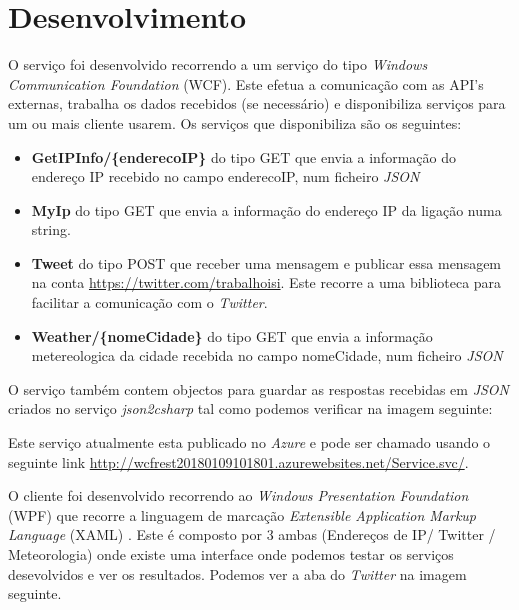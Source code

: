\documentclass[11pt]{report}
\begin{document}
\chapter*{Desenvolvimento}

O serviço foi desenvolvido recorrendo a um serviço do tipo \textit{Windows Communication Foundation} (WCF). Este efetua a comunicação com as API's externas, trabalha os dados recebidos (se necessário) e disponibiliza serviços para um ou mais cliente usarem. Os serviços que disponibiliza são os seguintes:
\begin{itemize}
\item \textbf{GetIPInfo/\{enderecoIP\}} do tipo GET que envia a informação do endereço IP recebido no campo enderecoIP, num ficheiro \textit{JSON}
\item \textbf{MyIp} do tipo GET que envia a informação do endereço IP da ligação numa string.
\item \textbf{Tweet} do tipo POST que receber uma mensagem e publicar essa mensagem na conta \url{https://twitter.com/trabalhoisi}. Este recorre a uma biblioteca\cite{TinyTwitter} para facilitar a comunicação com o \textit{Twitter}.
\item \textbf{Weather/\{nomeCidade\}} do tipo GET que envia a informação metereologica da cidade recebida  no campo nomeCidade, num ficheiro \textit{JSON}
\end{itemize}

\clearpage

O serviço também contem objectos para guardar as respostas recebidas em \textit{JSON} criados no serviço \textit{json2csharp} tal como podemos verificar na imagem seguinte:



Este serviço atualmente esta publicado no \textit{Azure} e pode ser chamado usando o seguinte link \url{http://wcfrest20180109101801.azurewebsites.net/Service.svc/}.

\clearpage

O cliente foi  desenvolvido recorrendo ao \textit{Windows Presentation Foundation} (WPF) que recorre a linguagem de marcação \textit{Extensible Application Markup Language} (XAML) . Este é composto por 3 ambas (Endereços de IP/ Twitter / Meteorologia) onde existe uma interface onde podemos testar os serviços desevolvidos e ver os resultados. Podemos ver a aba do \textit{Twitter} na imagem seguinte.



\end{document}
